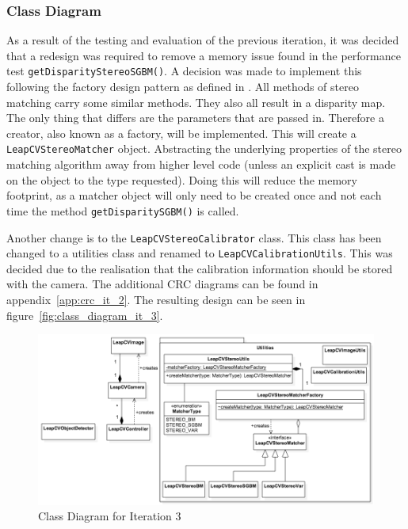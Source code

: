 \documentclass[11pt,oneside]{report}
\newcommand\code[1]{\texttt{#1}}
\begin{document}
			\subsubsection{Class Diagram}
				As a result of the testing and evaluation of the previous iteration, it was decided that a redesign was required to remove a memory issue found in the performance test \code{getDisparityStereoSGBM()}.
				A decision was made to implement this following the factory design pattern as defined in .
				All methods of stereo matching carry some similar methods.
				They also all result in a disparity map.
				The only thing that differs are the parameters that are passed in.
				Therefore a creator, also known as a factory, will be implemented. 
				This will create a \code{LeapCVStereoMatcher} object.
				Abstracting the underlying properties of the stereo matching algorithm away from higher level code (unless an explicit cast is made on the object to the type requested).
				Doing this will reduce the memory footprint, as a matcher object will only need to be created once and not each time the method \code{getDisparitySGBM()} is called.
				
				Another change is to the \code{LeapCVStereoCalibrator} class.
				This class has been changed to a utilities class and renamed to \code{LeapCVCalibrationUtils}.
				This was decided due to the realisation that the calibration information should be stored with the camera.							
				The additional CRC diagrams can be found in appendix~\ref{app:crc_it_2}.
				The resulting design can be seen in figure~\ref{fig:class_diagram_it_3}.
				
			\begin{figure}
		\centering
    			\includegraphics[width=\textheight, angle=90]{class_diagram_it_3}
    			\caption{Class Diagram for Iteration 3 \protect {\label{fig:class_diagram_it_3}}}
			
		\end{figure}			
\end{document}

